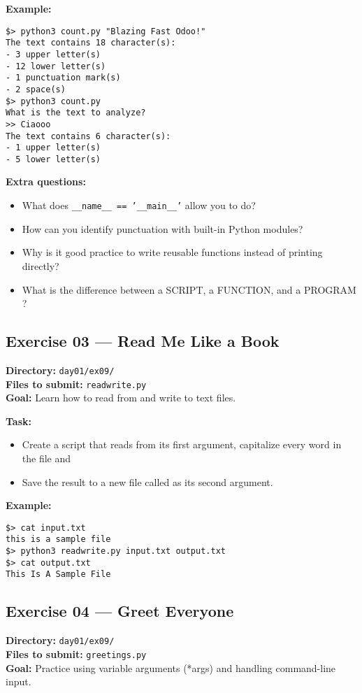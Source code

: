 \documentclass[12pt,a4paper]{article}
\begin{document}
\textbf{Example:}
\begin{lstlisting}
$> python3 count.py "Blazing Fast Odoo!"
The text contains 18 character(s):
- 3 upper letter(s)
- 12 lower letter(s)
- 1 punctuation mark(s)
- 2 space(s)
$> python3 count.py
What is the text to analyze?
>> Ciaooo
The text contains 6 character(s):
- 1 upper letter(s)
- 5 lower letter(s)
\end{lstlisting}

\textbf{Extra questions:}
\begin{itemize}
  \item What does \texttt{\_\_name\_\_ == '\_\_main\_\_'} allow you to do?
  \item How can you identify punctuation with built-in Python modules?
  \item Why is it good practice to write reusable functions instead of printing directly?
  \item What is the difference between a SCRIPT, a FUNCTION, and a PROGRAM ?
\end{itemize}

\newpage
\subsection*{Exercise 03 — Read Me Like a Book}
\textbf{Directory:} \texttt{day01/ex09/}\\
\textbf{Files to submit:} \texttt{readwrite.py}\\
\textbf{Goal:} Learn how to read from and write to text files.

\textbf{Task:}
\begin{itemize}
  \item Create a script that reads from its first argument, capitalize every word in the file and
  \item Save the result to a new file called as its second argument.
\end{itemize}

\textbf{Example:}
\begin{lstlisting}
$> cat input.txt
this is a sample file
$> python3 readwrite.py input.txt output.txt
$> cat output.txt
This Is A Sample File
\end{lstlisting}

\newpage
\subsection*{Exercise 04 — Greet Everyone}
\textbf{Directory:} \texttt{day01/ex09/}\\
\textbf{Files to submit:} \texttt{greetings.py}\\
\textbf{Goal:} Practice using variable arguments (*args) and handling command-line input.
\end{document}

